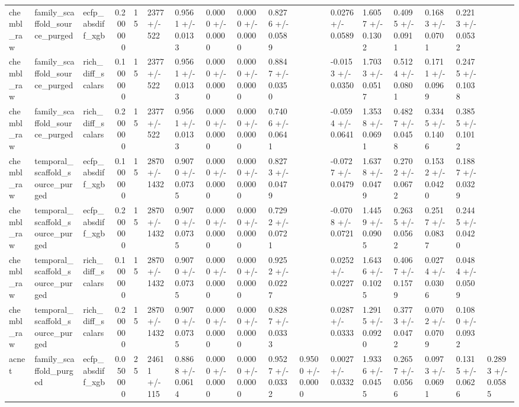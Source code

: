 \begin{longtable}{lllrlllllllllllll}
chembl\_raw & family\_scaffold\_source\_purged & ecfp\_absdiff\_xgb & 0.200000 & 15 & 2377 +/- 522 & 0.9561 +/- 0.0133 & 0.0000 +/- 0.0000 & 0.0000 +/- 0.0000 & 0.8276 +/- 0.0589 &  & 0.0276 +/- 0.0589 & 1.6057 +/- 0.1302 & 0.4095 +/- 0.0911 & 0.1683 +/- 0.0701 & 0.2213 +/- 0.0532 &  \\
chembl\_raw & family\_scaffold\_source\_purged & rich\_diff\_scalars & 0.100000 & 15 & 2377 +/- 522 & 0.9561 +/- 0.0133 & 0.0000 +/- 0.0000 & 0.0000 +/- 0.0000 & 0.8847 +/- 0.0350 &  & -0.0153 +/- 0.0350 & 1.7033 +/- 0.0517 & 0.5124 +/- 0.0801 & 0.1711 +/- 0.0969 & 0.2475 +/- 0.1038 &  \\
chembl\_raw & family\_scaffold\_source\_purged & rich\_diff\_scalars & 0.200000 & 15 & 2377 +/- 522 & 0.9561 +/- 0.0133 & 0.0000 +/- 0.0000 & 0.0000 +/- 0.0000 & 0.7406 +/- 0.0641 &  & -0.0594 +/- 0.0641 & 1.3538 +/- 0.0691 & 0.4827 +/- 0.0458 & 0.3345 +/- 0.1406 & 0.3855 +/- 0.1012 &  \\
chembl\_raw & temporal\_scaffold\_source\_purged & ecfp\_absdiff\_xgb & 0.100000 & 15 & 2870 +/- 1432 & 0.9070 +/- 0.0735 & 0.0000 +/- 0.0000 & 0.0000 +/- 0.0000 & 0.8273 +/- 0.0479 &  & -0.0727 +/- 0.0479 & 1.6378 +/- 0.0479 & 0.2702 +/- 0.0672 & 0.1532 +/- 0.0420 & 0.1887 +/- 0.0329 &  \\
chembl\_raw & temporal\_scaffold\_source\_purged & ecfp\_absdiff\_xgb & 0.200000 & 15 & 2870 +/- 1432 & 0.9070 +/- 0.0735 & 0.0000 +/- 0.0000 & 0.0000 +/- 0.0000 & 0.7292 +/- 0.0721 &  & -0.0708 +/- 0.0721 & 1.4459 +/- 0.0905 & 0.2635 +/- 0.0562 & 0.2517 +/- 0.0837 & 0.2445 +/- 0.0420 &  \\
chembl\_raw & temporal\_scaffold\_source\_purged & rich\_diff\_scalars & 0.100000 & 15 & 2870 +/- 1432 & 0.9070 +/- 0.0735 & 0.0000 +/- 0.0000 & 0.0000 +/- 0.0000 & 0.9252 +/- 0.0227 &  & 0.0252 +/- 0.0227 & 1.6436 +/- 0.1025 & 0.4067 +/- 0.1579 & 0.0274 +/- 0.0306 & 0.0484 +/- 0.0509 &  \\
chembl\_raw & temporal\_scaffold\_source\_purged & rich\_diff\_scalars & 0.200000 & 15 & 2870 +/- 1432 & 0.9070 +/- 0.0735 & 0.0000 +/- 0.0000 & 0.0000 +/- 0.0000 & 0.8287 +/- 0.0333 &  & 0.0287 +/- 0.0333 & 1.2915 +/- 0.0920 & 0.3773 +/- 0.0472 & 0.0702 +/- 0.0709 & 0.1080 +/- 0.0932 &  \\
acnet & family\_scaffold\_purged & ecfp\_absdiff\_xgb & 0.050000 & 25 & 24611 +/- 115 & 0.8868 +/- 0.0614 & 0.0000 +/- 0.0000 & 0.0000 +/- 0.0000 & 0.9527 +/- 0.0332 & 0.9500 +/- 0.0000 & 0.0027 +/- 0.0332 & 1.9336 +/- 0.0455 & 0.2657 +/- 0.0566 & 0.0973 +/- 0.0691 & 0.1315 +/- 0.0626 & 0.2893 +/- 0.0585 \\

\end{longtable}
